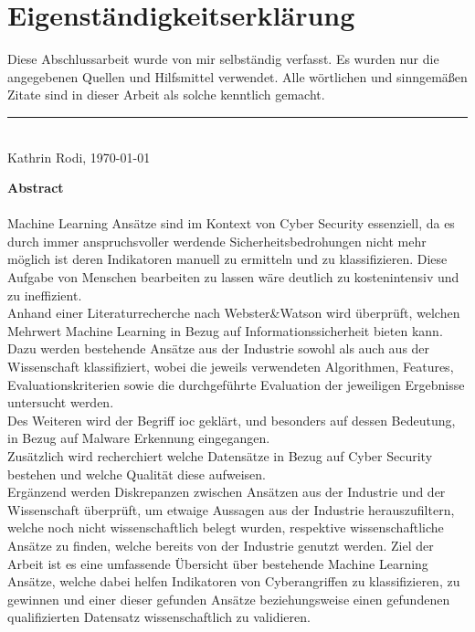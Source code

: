 \documentclass[
    12pt, %
    DIV10,
    ngerman, %
    a4paper, %
    oneside, %
    titlepage, %
    parskip=half, %
    headings=normal, %
    listof=totoc, %
    bibliography=totoc, %
    index=totoc, %
    captions=tableheading, %
    final %
]{scrreprt}
\begin{document}
\section*{Eigenständigkeitserklärung}
Diese Abschlussarbeit wurde von mir selbständig verfasst. Es wurden nur die angegebenen
Quellen und Hilfsmittel verwendet. Alle wörtlichen und sinngemäßen Zitate
sind in dieser Arbeit als solche kenntlich gemacht.
\begin{center}
\end{center}
\rule[0.5em]{25em}{0.5pt} \\
Kathrin Rodi, \today
 \begin{center}
 \end{center}
\newpage
\noindent \textbf{Abstract}\\\\
\noindent Machine Learning Ansätze sind im Kontext von Cyber Security essenziell, da es durch immer anspruchsvoller werdende Sicherheitsbedrohungen nicht mehr möglich ist deren Indikatoren manuell zu ermitteln und zu klassifizieren. Diese Aufgabe von Menschen bearbeiten zu lassen wäre deutlich zu kostenintensiv und zu ineffizient.\\
\noindent Anhand einer Literaturrecherche nach Webster\&Watson wird überprüft, welchen Mehrwert Machine Learning in Bezug auf Informationssicherheit bieten kann. Dazu werden bestehende Ansätze aus der Industrie sowohl als auch aus der Wissenschaft klassifiziert, wobei die jeweils verwendeten Algorithmen, Features, Evaluationskriterien sowie die durchgeführte Evaluation der jeweiligen Ergebnisse untersucht werden.\\
\noindent Des Weiteren wird der Begriff \acf{ioc} geklärt, und besonders auf dessen Bedeutung, in Bezug auf Malware Erkennung eingegangen.\\
\noindent Zusätzlich wird recherchiert welche Datensätze in Bezug auf Cyber Security bestehen und welche Qualität diese aufweisen.\\
\noindent Ergänzend werden Diskrepanzen zwischen Ansätzen aus der Industrie und der Wissenschaft überprüft, um etwaige Aussagen aus der Industrie herauszufiltern, welche noch nicht wissenschaftlich belegt wurden, respektive wissenschaftliche Ansätze zu finden, welche bereits von der Industrie genutzt werden.
\noindent Ziel der Arbeit ist es eine umfassende Übersicht über bestehende Machine Learning Ansätze, welche dabei helfen Indikatoren von Cyberangriffen zu klassifizieren, zu gewinnen und einer dieser gefunden Ansätze beziehungsweise einen gefundenen qualifizierten Datensatz wissenschaftlich zu validieren. 
\newpage
{}
\tableofcontents
{}
\newpage
\end{document}

